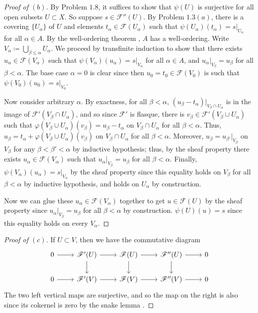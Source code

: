 \documentclass[12pt,letterpaper]{article}
\theoremstyle{definition}
\theoremstyle{remark}
\numberwithin{equation}{section}
\numberwithin{figure}{problem}
\begin{document}
\begin{proof}[Proof of $(b)$]
  By Problem $1.8$, it suffices to show that $\psi(U)$ is surjective for all open subsets $U \subset X$. So suppose $s \in \mathscr{F}''(U)$. By Problem $1.3(a)$, there is a covering $\{U_\alpha\}$ of $U$ and elements $t_\alpha \in \mathscr{F}(U_\alpha)$ such that $\psi(U_\alpha)(t_\alpha) = s\vert_{U_\alpha}$ for all $\alpha \in A$. By the well-ordering theorem \cite[p.~253]{Sho01}, $A$ has a well-ordering. Write $V_\alpha \coloneqq \bigcup_{\beta \le \alpha} U_\alpha$. We proceed by transfinite induction \cite[p.~247]{Sho01} to show that there exists $u_\alpha \in \mathscr{F}(V_\alpha)$ such that $\psi(V_\alpha)(u_\alpha) = s\vert_{V_\alpha}$ for all $\alpha \in A$, and $u_\alpha\vert_{V_\beta} = u_\beta$ for all $\beta < \alpha$. The base case $\alpha = 0$ is clear since then $u_0 = t_0 \in \mathscr{F}(V_0)$ is such that $\psi(V_0)(u_0) = s\vert_{V_0}$.
  \par Now consider arbitrary $\alpha$. By exactness, for all $\beta < \alpha$, $(u_\beta - t_\alpha)\vert_{V_\beta\cap U_\alpha}$ is in the image of $\mathscr{F}'(V_\beta \cap U_\alpha)$, and so since $\mathscr{F}'$ is flasque, there is $v_\beta \in \mathscr{F}'(V_\beta \cup U_\alpha)$ such that $\varphi(V_\beta \cup U_\alpha)(v_\beta) = u_\beta - t_\alpha$ on $V_\beta \cap U_\alpha$ for all $\beta < \alpha$. Thus, $u_\beta = t_\alpha + \varphi(V_\beta \cup U_\alpha)(v_\beta)$ on $V_\beta \cap U_\alpha$ for all $\beta < \alpha$. Moreover, $u_\beta = u_{\beta'}\vert_{V_{\beta}}$ on $V_\beta$ for any $\beta < \beta' < \alpha$ by inductive hypothesis; thus, by the sheaf property there exists $u_\alpha \in \mathscr{F}(V_\alpha)$ such that $u_\alpha\vert_{V_\beta} = u_\beta$ for all $\beta < \alpha$. Finally, $\psi(V_\alpha)(u_\alpha) = s\vert_{V_\alpha}$ by the sheaf property since this equality holds on $V_\beta$ for all $\beta < \alpha$ by inductive hypothesis, and holds on $U_\alpha$ by construction.
  \par Now we can glue these $u_\alpha \in \mathscr{F}(V_\alpha)$ together to get $u \in \mathscr{F}(U)$ by the sheaf property since $u_\alpha\vert_{V_\beta} = u_\beta$ for all $\beta < \alpha$ by construction. $\psi(U)(u) = s$ since this equality holds on every $V_\alpha$.
\end{proof}
\begin{proof}[Proof of $(c)$]
  If $U \subset V$, then we have the commutative diagram
  \begin{equation*}
    \begin{tikzcd}
      0 \rar & \mathscr{F}'(U) \rar\dar & \mathscr{F}(U) \rar\dar & \mathscr{F}''(U) \rar\dar & 0\\
      0 \rar & \mathscr{F}'(V) \rar & \mathscr{F}(V) \rar & \mathscr{F}''(V) \rar & 0
    \end{tikzcd}
  \end{equation*}
  The two left vertical maps are surjective, and so the map on the right is also since its cokernel is zero by the snake lemma \cite[Prop.~2.10]{AM69}.
\end{proof}
\end{document}
